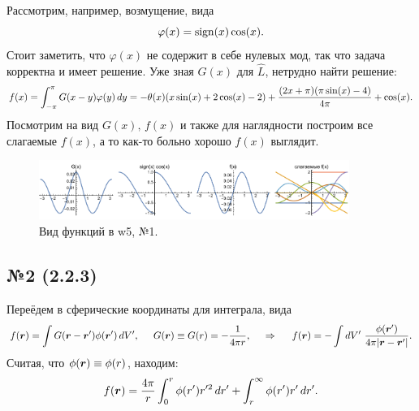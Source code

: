 Рассмотрим, например, возмущение, вида
\begin{equation*}
    \varphi(x) = \mathop{\mathrm{sign}}\nolimits(x) \cos (x).
\end{equation*}
Стоит заметить, что $\varphi(x)$ не содержит в себе нулевых мод, так что задача корректна и имеет решение. 
Уже зная $G(x)$ для $\hat{L}$, нетрудно найти решение:
\begin{equation*}
    f(x) = \int_{-\pi}^{\pi} G(x-y) \varphi(y) \, d y = 
    -\theta (x) (x \sin (x)+2 \cos (x)-2)+\frac{(2 x+\pi ) (\pi  \sin (x)-4)}{4 \pi }+\cos (x).
\end{equation*}
Посмотрим на вид $G(x),\, f(x)$ и также для наглядности построим все слагаемые $f(x)$, а то как-то больно хорошо $f(x)$ выглядит.
\begin{figure}[ht]
    \centering
    \includegraphics[width=0.9\textwidth]{figures/w5_1.pdf}
    \caption{Вид функций в w5, №1.}
\end{figure}


\subsection*{№2 (2.2.3)}


Переёдем в сферические координаты для интеграла, вида
\begin{equation*}
    f(\mbox{\boldmath $r$}) = \int G(\mbox{\boldmath $r$} - \mbox{\boldmath $r$}') \phi(\mbox{\boldmath $r$}') \, d V',
    \hspace{5 mm} 
    G(\mbox{\boldmath $r$}) \equiv G(r) = - \frac{1}{4 \pi r},
    \hspace{0.5cm} \Rightarrow \hspace{0.5cm}
    f(\mbox{\boldmath $r$}) = - \int dV'\ \frac{\phi(\mbox{\boldmath $r$}')}{4 \pi |\mbox{\boldmath $r$}-\mbox{\boldmath $r$}'|}.
\end{equation*}
Считая, что $\phi(\mbox{\boldmath $r$}) \equiv \phi(r)$, находим:
\begin{equation*}
    f(\mbox{\boldmath $r$}) = \frac{4\pi}{r} \int_0^r \phi(r') r'^2 \, d r' + \int_r^\infty \phi (r') r' \, d r'.
\end{equation*}







